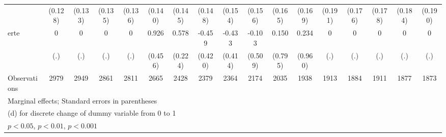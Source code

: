 {\begin{tabular}{l*{16}{c}}
                    &     (0.128)         &     (0.133)         &     (0.135)         &     (0.136)         &     (0.140)         &     (0.145)         &     (0.148)         &     (0.154)         &     (0.156)         &     (0.165)         &     (0.169)         &     (0.191)         &     (0.176)         &     (0.178)         &     (0.184)         &     (0.190)         \\
[1em]
erte                &           0         &           0         &           0         &           0         &       0.926\sym{*}  &       0.578\sym{**} &      -0.459         &      -0.433         &      -0.103         &       0.150         &       0.234         &           0         &           0         &           0         &           0         &           0         \\
                    &         (.)         &         (.)         &         (.)         &         (.)         &     (0.456)         &     (0.224)         &     (0.420)         &     (0.414)         &     (0.509)         &     (0.795)         &     (0.960)         &         (.)         &         (.)         &         (.)         &         (.)         &         (.)         \\
\hline
Observations        &        2979         &        2949         &        2861         &        2811         &        2665         &        2428         &        2379         &        2364         &        2174         &        2035         &        1938         &        1913         &        1884         &        1911         &        1877         &        1873         \\
\hline\hline
\multicolumn{17}{l}{\footnotesize Marginal effects; Standard errors in parentheses}\\
\multicolumn{17}{l}{\footnotesize  (d) for discrete change of dummy variable from 0 to 1}\\
\multicolumn{17}{l}{\footnotesize \sym{*} \(p<0.05\), \sym{**} \(p<0.01\), \sym{***} \(p<0.001\)}\\
\end{tabular}
}
